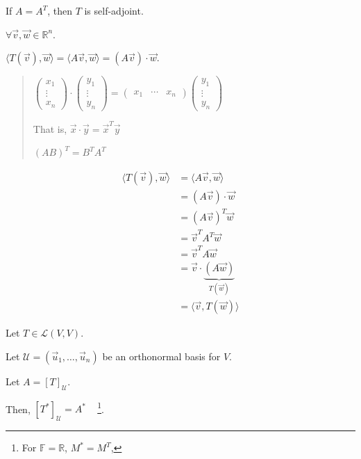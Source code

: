 \documentclass[11pt,fleqn]{book} %
\begin{document}
If $A = A^T$, then $T$ is self-adjoint.

$\forall \vec{v}, \vec{w} \in \mathbb{R}^n$.

$\langle T(\vec{v}), \vec{w} \rangle = \langle A\vec{v}, \vec{w} \rangle = (A\vec{v}) \cdot \vec{w}$.

\begin{quote}
    $\begin{pmatrix} x_1 \\ \vdots \\ x_n \end{pmatrix} \cdot \begin{pmatrix} y_1 \\ \vdots \\ y_n \end{pmatrix} = \begin{pmatrix} x_1 &\cdots &x_n \end{pmatrix} \begin{pmatrix} y_1 \\ \vdots \\ y_n \end{pmatrix}$

    That is, $\vec{x} \cdot \vec{y} = \vec{x}^T \vec{y}$

    $(AB)^T = B^TA^T$
\end{quote}
\begin{align*}
    \langle T(\vec{v}), \vec{w} \rangle
    &= \langle A\vec{v}, \vec{w} \rangle
    \\
    &= (A\vec{v}) \cdot \vec{w}
    \\
    &= (A\vec{v})^T\vec{w}
    \\
    &= \vec{v}^TA^T\vec{w}
    \\
    &= \vec{v}^TA\vec{w}
    \\
    &= \vec{v} \cdot \underbrace{(A\vec{w})}_{T(\vec{w})}
    \\
    &= \langle \vec{v}, T(\vec{w}) \rangle
\end{align*}

\setcounter{section}{0}
\setcounter{dummy}{7}
\begin{theorem}
    Let $T \in \mathcal{L}(V, V)$.

    Let $\mathcal{U} = (\vec{u}_1, \dots, \vec{u}_n)$ be an orthonormal basis for $V$.

    Let $A = [T]_\mathcal{U}$.

    Then, $[T^*]_\mathcal{U} = A^*$ ~ \footnote{For $\mathbb{F} = \mathbb{R}$, $M^* = M^T$, }.
\end{theorem}
\setcounter{section}{5}
\end{document}
